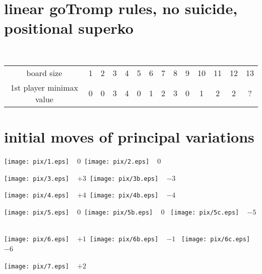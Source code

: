 \documentclass[12pt]{article}
\begin{document}
\section*{linear go\hfill Tromp rules, no suicide, positional superko}

~

{\large\begin{tabular}{cccccccccccccc}
board size & 1 & 2 & 3 & 4 & 5 & 6 & 7 & 8 & 9 & 10 & 11 & 12 & 13 \\
1st player minimax value & 0 & 0 & 3 & 4 & 0 & 1 & 2 & 3 & 0 & 1 & 2 & 2 & ? \\
\end{tabular}}
\vfill

\section*{initial moves of principal variations}
\vfill

\hfill\texttt{[image: pix/1.eps]} ~ 0\
\hfill\texttt{[image: pix/2.eps]} ~ 0\hfill~
\vfill

\hfill\texttt{[image: pix/3.eps]} ~ $+3$\
\hfill\texttt{[image: pix/3b.eps]} ~ $-3$\hfill~
\vfill~

\hfill\texttt{[image: pix/4.eps]} ~ $+4$\
\hfill\texttt{[image: pix/4b.eps]} ~ $-4$\hfill~
\vfill~

\hfill\texttt{[image: pix/5.eps]} ~ $0$\
\hfill\texttt{[image: pix/5b.eps]} ~ $0$\hfill~
\hfill\texttt{[image: pix/5c.eps]} ~ $-5$\hfill~
\vfill~

\hfill\texttt{[image: pix/6.eps]} ~ $+1$\
\hfill\texttt{[image: pix/6b.eps]} ~ $-1$\hfill~
\hfill\texttt{[image: pix/6c.eps]} ~ $-6$\hfill~
\vfill~

\hfill\texttt{[image: pix/7.eps]} ~ $+2$\hfill~
\vfill~
\end{document}

